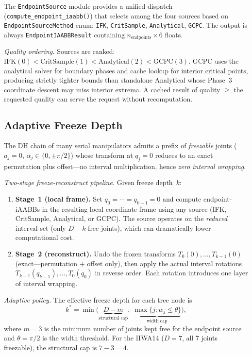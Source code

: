 \documentclass[journal]{IEEEtran}
\begin{document}
The \texttt{EndpointSource} module provides a unified dispatch
(\texttt{compute\_endpoint\_iaabb()}) that selects among the
four sources based on \texttt{EndpointSourceMethod} enum:
\texttt{IFK}, \texttt{CritSample}, \texttt{Analytical}, \texttt{GCPC}.
The output is always \texttt{EndpointIAABBResult}
containing $n_\text{endpoints} \times 6$ floats.

\emph{Quality ordering.}
Sources are ranked:
$\mathrm{IFK}(0) < \mathrm{CritSample}(1) <
\mathrm{Analytical}(2) < \mathrm{GCPC}(3)$.
GCPC uses the analytical solver for boundary phases and cache
lookup for interior critical points, producing strictly tighter
bounds than standalone Analytical whose Phase~3 coordinate descent
may miss interior extrema.
A cached result of quality $\geq$ the requested quality can serve
the request without recomputation.

\subsection{Adaptive Freeze Depth}\label{sec:freeze}

The DH chain of many serial manipulators admits a prefix of
\emph{freezable} joints ($a_j{=}0$, $\alpha_j \in \{0, \pm\pi/2\}$)
whose transform at $q_j{=}0$ reduces to an exact permutation plus
offset---no interval multiplication, hence \emph{zero interval
wrapping}.

\emph{Two-stage freeze-reconstruct pipeline.}
Given freeze depth~$k$:
\begin{enumerate}
  \item \textbf{Stage~1 (local frame).}
    Set $q_0{=}{\cdots}{=}q_{k-1}{=}0$ and compute endpoint-iAABBs
    in the resulting local coordinate frame using any source
    (IFK, CritSample, Analytical, or GCPC).
    The source operates on the \emph{reduced} interval set
    (only $D{-}k$ free joints), which can dramatically lower
    computational cost.
  \item \textbf{Stage~2 (reconstruct).}
    Undo the frozen transforms $T_0(0),\ldots,T_{k-1}(0)$
    (exact---permutation + offset only), then apply the
    actual interval rotations $T_{k-1}(q_{k-1}),\ldots,T_0(q_0)$
    in reverse order.
    Each rotation introduces one layer of interval wrapping.
\end{enumerate}

\emph{Adaptive policy.}
The effective freeze depth for each tree node is
\begin{equation}\label{eq:freeze_depth}
  k^* = \min\!\bigl(
    \underbrace{D - m}_\text{structural cap},\;
    \underbrace{\max\{j : w_j \leq \theta\}}_\text{width cap}
  \bigr),
\end{equation}
where $m{=}3$ is the minimum number of joints kept free for the
endpoint source and $\theta{=}\pi/2$ is the width threshold.
For the IIWA14 ($D{=}7$, all 7 joints freezable),
the structural cap is $7{-}3{=}4$.
\end{document}

